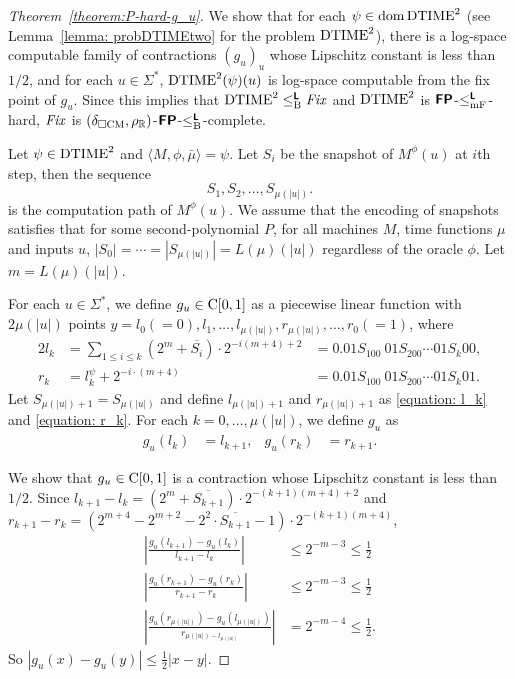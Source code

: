 \documentclass[envcountsame,orivec,oribibl]{llncs}
\begin{document}
\begin{proof}[Theorem~\ref{theorem:P-hard-g_u}]
 We show that for each $\psi \in \mathop{\rm dom} \mathrm{DTIME}^2$
 (see Lemma~\ref{lemma: probDTIMEtwo} for the problem $\mathrm{DTIME}^2$),
 there is a log-space computable family of contractions $(g_u)_u$ whose
 Lipschitz constant is less than $1/2$,
 and for each $u \in \Sigma^*$, $\mathrm{DTIME}^2(\psi)(u)$ is log-space 
 computable from the fix point of $g_u$.
 Since this implies that $\mathrm{DTIME}^2 \leq _{\mathrm B} ^{\text{\bfseries \sffamily \upshape L}} \mathit{Fix}$ and $\mathrm{DTIME}^2$
 is $\text{\bfseries \sffamily \upshape FP}$-$\leq _{\mathrm{mF}} ^{\text{\bfseries \sffamily \upshape L}}$-hard, $\mathit{Fix}$ is 
 $(\delta _{\square \mathrm{CM}}, \rho _\mathbb R)$-$\text{\bfseries \sffamily \upshape FP}$-$\leq _{\mathrm B} ^{\text{\bfseries \sffamily \upshape L}}$-complete.

 Let $\psi \in \mathrm{DTIME}^2$ and $\langle M, \phi, \bar \mu \rangle = \psi$.
 Let $S_i$ be the snapshot of $M^\phi(u)$ at $i$th step, then the sequence
 \begin{equation}
  S_1, S_2, \dots, S_{\mu(|u|)}.
 \end{equation}
 is the computation path of $M^\phi(u)$.
 We assume that the encoding of snapshots satisfies that 
 for some second-polynomial $P$, for all machines $M$, time functions $\mu$ 
 and inputs $u$, $|S_0| = \cdots = |S_{\mu(|u|)}| = L(\mu)(|u|)$
 regardless of the oracle $\phi$.
 Let $m = L(\mu)(|u|)$.


 For each $u \in \Sigma^*$, we define $g_u \in \mathrm C[0,1]$ as
 a piecewise linear function with $2\mu(|u|)$ points
 $y = l_0 (=0), l_1, \dots, l_{\mu(|u|)}, r_{\mu(|u|)}, \dots, r_0(=1)$,
 where
\begin{alignat}{2}
 \label{equation: l_k}
 l_k 
 &
 = \sum_{1 \le i \le k} (2^m+\overline{S_i}) \cdot 2^{-i(m+4)+2} 
 &
 = 0.01S_100\ 01S_200 \cdots 01S_k00,
 \\
 \label{equation: r_k}
 r_k
 &
 = l^\psi_k + 2^{-i \cdot (m+4)}
 &
 = 0.01S_100\ 01S_200 \cdots 01S_k01.
\end{alignat}
 Let $S_{\mu(|u|)+1} = S_{\mu(|u|)}$ and
 define $l_{\mu(|u|)+1}$ and $r_{\mu(|u|)+1}$ as
 \eqref{equation: l_k} and \eqref{equation: r_k}.
 For each $k = 0, \dots, \mu(|u|)$,
 we define $g_u$ as
 \begin{align}
 g_u(l_k) &= l_{k+1},
 &
 g_u(r_k) &= r_{k+1}.
 \end{align}

 We show that $g_u \in \mathrm C[0,1]$ is a contraction whose Lipschitz constant
 is less than $1/2$.
 Since $l_{k+1} - l_{k} = (2^m+\overline{S_{k+1}}) \cdot 2^{-(k+1)(m+4)+2} $
 and $r_{k+1} - r_{k} = (2^{m+4} - 2^{m+2} - 2^2 \cdot \overline{S_{k+1}} - 1)
 \cdot 2^{-(k+1)(m+4)} $,
\begin{align}
 \left|\frac{g_u(l_{k+1}) - g_u(l_k)}{l_{k+1} - l_k} \right| 
 &
 \le 2^{-m-3} \le \frac 1 2
 \\
 \left|\frac{g_u(r_{k+1}) - g_u(r_k)}{r_{k+1} - r_k} \right| 
 &
 \le 2^{-m-3} \le \frac 1 2
 \\
 \left|\frac{g_u(r_{\mu(|u|)}) - g_u(l_{\mu(|u|)})}{r_{\mu(|u|) - l_{\mu(|u|)}}} \right| 
 &
 = 2^{-m-4} \le \frac 1 2.
\end{align}
 So $|g_u(x) - g_u(y)| \le \frac 1 2 |x-y|$.


\end{proof}
\end{document}
